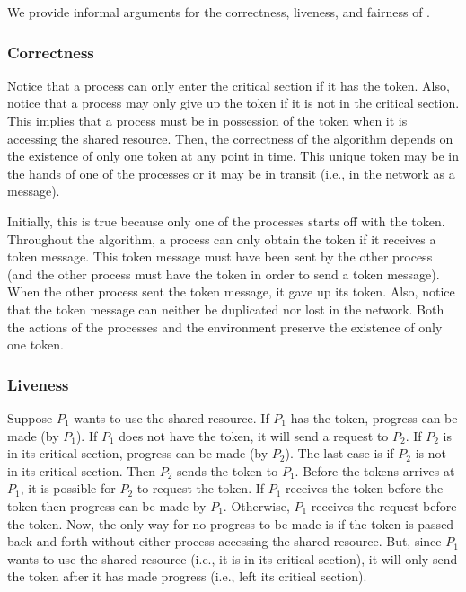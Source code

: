\documentclass[final]{article}
\begin{document}
We provide informal arguments for the correctness, liveness, and
fairness of \mpp.

\subsubsection{Correctness}

Notice that a process can only enter the critical section if it has
the token.  Also, notice that a process may only give up the token if
it is not in the critical section.  This implies that a process must
be in possession of the token when it is accessing the shared
resource.  Then, the correctness of the algorithm depends on the
existence of only one token at any point in time.  This unique token
may be in the hands of one of the processes or it may be in transit
(i.e., in the network as a message).

Initially, this is true because only one of the processes starts off
with the token.  Throughout the algorithm, a process can only obtain
the token if it receives a token message.  This token message must
have been sent by the other process (and the other process must have
the token in order to send a token message).  When the other process
sent the token message, it gave up its token.  Also, notice that the
token message can neither be duplicated nor lost in the network.  Both
the actions of the processes and the environment preserve the
existence of only one token.

\subsubsection{Liveness}

Suppose $P_1$ wants to use the shared resource.
%
If $P_1$ has the token, progress can be made (by $P_1$).
%
If $P_1$ does not have the token, it will send a request to $P_2$.
%
If $P_2$ is in its critical section, progress can be made (by $P_2$).
%
The last case is if $P_2$ is not in its critical section.  Then $P_2$
sends the token to $P_1$.
%
Before the tokens arrives at $P_1$, it is possible for $P_2$ to
request the token.  If $P_1$ receives the token before the token then
progress can be made by $P_1$.  Otherwise, $P_1$ receives the request
before the token.
%
Now, the only way for no progress to be made is if the token is passed
back and forth without either process accessing the shared resource.
%
%
But, since $P_1$ wants to use the shared resource (i.e., it is in its
critical section), it will only send the token after it has made
progress (i.e., left its critical section).
\end{document}

